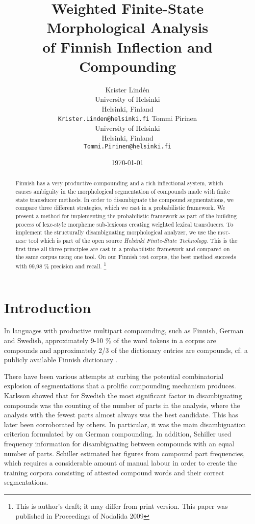 \documentclass[11pt]{article}
\title{Weighted Finite-State Morphological Analysis\\
  of Finnish Inflection and Compounding
  }
\author{Krister Lindén\\
  University of Helsinki\\
  Helsinki, Finland\\
  {\tt Krister.Linden@helsinki.fi} \And
  Tommi Pirinen\\
  University of Helsinki\\
  Helsinki, Finland\\
  {\tt Tommi.Pirinen@helsinki.fi} }
\date{\today}
\begin{document}
\maketitle
\begin{abstract}
  Finnish has a very productive compounding and a rich inflectional
  system, which causes ambiguity in the morphological segmentation of
  compounds made with finite state transducer methods. In order to
  disambiguate the compound segmentations, we compare three different
  strategies, which we cast in a probabilistic framework. We present a
  method for implementing the probabilistic framework as part of the
  building process of lexc-style morpheme sub-lexicons creating
  weighted lexical transducers. To implement the structurally
  disambiguating morphological analyzer, we use the \textsc{hfst-lexc}
  tool which is part of the open source \emph{Helsinki Finite-State
    Technology}. This is the first time all three principles are cast
  in a probabilistic framework and compared on the same corpus using
  one tool. On our Finnish test corpus, the best method succeeds with
  99,98 \% precision and recall.
  \footnote{This is author's draft; it may differ from print version.
  This paper was published in Proceedings of Nodalida 2009}
\end{abstract}

\section{Introduction}

In languages with productive multipart compounding, such as Finnish,
German and Swedish, approximately 9-10 \% of the word tokens in a
corpus are compounds \cite{hedlund/2002} and approximately 2/3 of the
dictionary entries are compounds, cf. a publicly available Finnish
dictionary \cite{kotus/2007}.

There have been various attempts at curbing the potential
combinatorial explosion of segmentations that a prolific compounding
mechanism produces. Karlsson  showed that for
Swedish the most significant factor in disambiguating compounds was
the counting of the number of parts in the analysis, where the
analysis with the fewest parts almost always was the best
candidate. This has later been corroborated by others. In particular,
it was the main disambiguation criterion formulated by
\cite{schiller/2005} on German compounding. In addition, Schiller used
frequency information for disambiguating between compounds with an
equal number of parts. Schiller estimated her figures from compound
part frequencies, which requires a considerable amount of manual
labour in order to create the training corpora consisting of attested
compound words and their correct segmentations.
\end{document}
